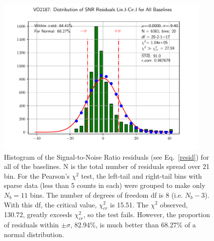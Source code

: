 \documentclass[letterpaper,twoside,12pt]{article}
\begin{document}
\begin{figure}[ht!]
  \begin{center}
  \includegraphics[width=25pc]{VO2187_Distr_SNR_Lin_I-Cir_I_Diff.pdf}
  \caption{\small  Histogram of the Signal-to-Noise Ratio residuals (see Eq.~\eqref{resid}) for all of the baselines. N is the total number of residuals spread over 21 bin. For the Pearson's $\chi^2$ test, the left-tail and right-tail bins with sparse data (less than 5 counts in each) were grouped to make only $N_b=11$ bins. The number of degrees of freedom df is 8 (i.e. $N_b-3$). With this df, the critical value, $\chi^2_{cr}$ is 15.51. The $\chi^2$ observed, 130.72, greatly exceeds $\chi^2_{cr}$, so the test fails. However, the proportion of residuals within $\pm\sigma$, 82.94\%, is much better than 68.27\% of a normal distribution.}
  \label{dsnr_distr}
  \end{center}
\end{figure}
\end{document}
